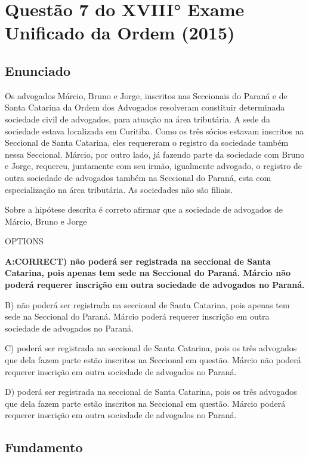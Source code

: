 \documentclass[12pt]{article}
\begin{document}
\section{Questão 7 do XVIII° Exame Unificado da Ordem (2015)}

\subsection{Enunciado}

Os advogados Márcio, Bruno e Jorge, inscritos nas Seccionais 
do Paraná e de Santa Catarina da Ordem dos Advogados 
resolveram constituir determinada sociedade civil de 
advogados, para atuação na área tributária. A sede da 
sociedade estava localizada em Curitiba. Como os três sócios 
estavam inscritos na Seccional de Santa Catarina, eles 
requereram o registro da sociedade também nessa Seccional. 
Márcio, por outro lado, já fazendo parte da sociedade com 
Bruno e Jorge, requereu, juntamente com seu irmão, 
igualmente advogado, o registro de outra sociedade de 
advogados também na Seccional do Paraná, esta com 
especialização na área tributária. As sociedades não são filiais. 
 
Sobre a hipótese descrita é correto afirmar que a sociedade de 
advogados de Márcio, Bruno e Jorge 
 
OPTIONS

\textbf{A:CORRECT) não poderá ser registrada na seccional de Santa Catarina, 
pois apenas tem sede na Seccional do Paraná. Márcio não 
poderá requerer inscrição em outra sociedade de 
advogados no Paraná. }

B) não poderá ser registrada na seccional de Santa Catarina, 
pois apenas tem sede na Seccional do Paraná. Márcio 
poderá requerer inscrição em outra sociedade de 
advogados no Paraná. 

C) poderá ser registrada na seccional de Santa Catarina, pois 
os três advogados que dela fazem parte estão inscritos na 
Seccional em questão. Márcio não poderá requerer 
inscrição em outra sociedade de advogados no Paraná. 

D) poderá ser registrada na seccional de Santa Catarina, pois 
os três advogados que dela fazem parte estão inscritos na 
Seccional em questão. Márcio poderá requerer inscrição 
em outra sociedade de advogados no Paraná. 

\subsection{Fundamento}
\end{document}
